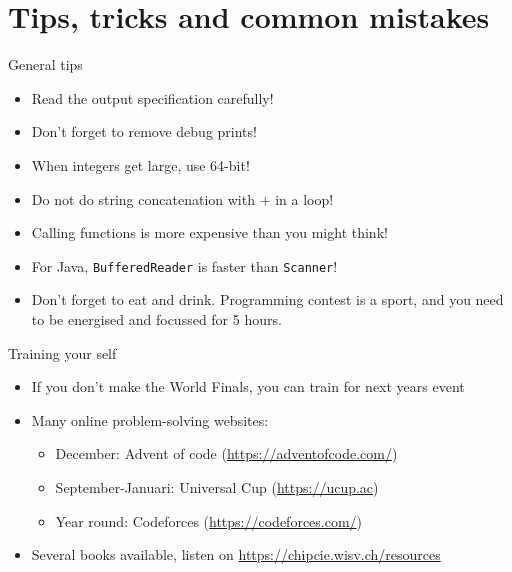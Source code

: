\documentclass[11pt,pdf, aspectratio=169]{beamer}
\begin{document}
  \section{Tips, tricks and common mistakes}
  \begin{frame}{General tips}
    \begin{itemize}
      \item Read the output specification carefully!
      \item Don’t forget to remove debug prints!
      \item When integers get large, use 64-bit!
      \item Do not do string concatenation with $+$ in a loop!
      \item Calling functions is more expensive than you might think!
      \item For Java, \texttt{BufferedReader} is faster than \texttt{Scanner}!
      \item Don’t forget to eat and drink.
      Programming contest is a sport, and you need to be energised and focussed for 5 hours.
    \end{itemize}
  \end{frame}
  \begin{frame}{Training your self}
    \begin{itemize}
      \item If you don't make the World Finals, you can train for next years event
      \item Many online problem-solving websites:
      \begin{itemize}
        \item December: Advent of code (\url{https://adventofcode.com/})
        \item September-Januari: Universal Cup (\url{https://ucup.ac})
        \item Year round: Codeforces (\url{https://codeforces.com/})
      \end{itemize}
      \item Several books available, listen on \url{https://chipcie.wisv.ch/resources}
    \end{itemize}
  \end{frame}
\end{document}
